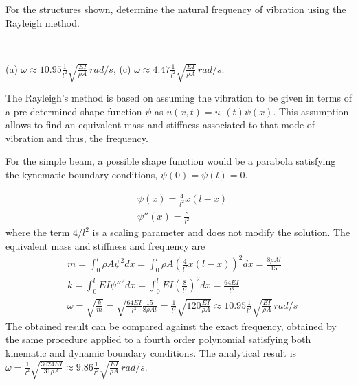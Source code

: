 
\begin{Exercise}[label={rayleigh_sdof}]
For the structures shown, determine the natural frequency of vibration using the Rayleigh method.

\begin{center}
     \\
\end{center}

\shortAnswer (a) $\omega \approx 10.95\frac{1}{l^2}\sqrt{\frac{EI}{\rho A}}\,\si{rad/s}$, (c) $\omega \approx 4.47\frac{1}{l^2}\sqrt{\frac{EI}{\rho A}}\,\si{rad/s}$.
\end{Exercise}


\begin{Answer}[ref={rayleigh_sdof}]
The Rayleigh's method is based on assuming the vibration to be given in terms of a pre-determined shape function $\psi$ as $u(x,t) = u_0(t)\psi(x)$. This assumption allows to find an equivalent mass and stiffness associated to that mode of vibration and thus, the frequency.

\parbox{.7\textwidth}{For the simple beam, a possible shape function would be a parabola satisfying the kynematic boundary conditions, $\psi(0) = \psi(l) = 0$.} \hspace{1em}
\parbox{.25\textwidth}{}
\begin{align*}
&\psi(x) = \frac{4}{l^2} x (l-x) \\
&\psi''(x) = \frac{8}{l^2}
\end{align*}
where the term $4/l^2$ is a scaling parameter and does not modify the solution. The equivalent mass and stiffness and frequency are
\begin{align*}
&m = \int_0^l \rho A\psi^2dx = \int_0^l \rho A \left(\frac{4}{l^2} x (l-x)\right)^2dx = \frac{8\rho Al}{15} \\
&k = \int_0^l EI \psi''^2 dx = \int_0^l EI \left(\frac{8}{l^2}\right)^2dx = \frac{64EI}{l^3} \\
&\omega = \sqrt{\frac{k}{m}} = \sqrt{\frac{64EI}{l^3}\frac{15}{8\rho Al}} = \frac{1}{l^2}\sqrt{120\frac{EI}{\rho A}} \approx 10.95\frac{1}{l^2}\sqrt{\frac{EI}{\rho A}}\,\si{rad/s}
\end{align*}
The obtained result can be compared against the exact frequency, obtained by the same procedure applied to a fourth order polynomial satisfying both kinematic and dynamic boundary conditions. The analytical result is $\omega = \frac{1}{l^2}\sqrt{\frac{3024EI}{31\rho A}} \approx 9.86\frac{1}{l^2}\sqrt{\frac{EI}{\rho A}}\,\si{rad/s}$.


\end{Answer}
